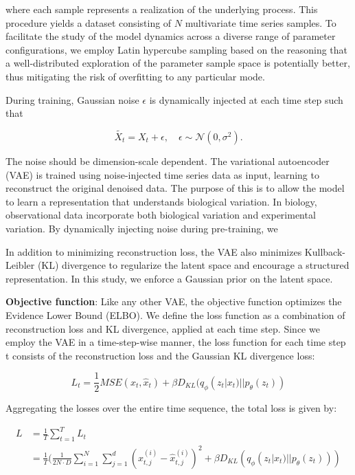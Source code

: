 \documentclass[12pt]{article} %
\begin{document}
where each sample represents a realization of the underlying process. This procedure yields a dataset consisting of \( N \) multivariate time series samples. To facilitate the study of the model dynamics across a diverse range of parameter configurations, we employ Latin hypercube sampling based on the reasoning that a well-distributed exploration of the parameter sample space is potentially better, thus mitigating the risk of overfitting to any particular mode\citep{mckay2000comparison}. 

During training, Gaussian noise \( \epsilon \) is dynamically injected at each time step such that  

$$
\tilde{X_t} = X_t + \epsilon, \quad \epsilon \sim \mathcal{N}(0, \sigma^2).
$$  

The noise should be dimension-scale dependent. The variational autoencoder (VAE) is trained using noise-injected time series data as input, learning to reconstruct the original denoised data. The purpose of this is to allow the model to learn a representation that understands biological variation. In biology, observational data incorporate both biological variation and experimental variation. By dynamically injecting noise during pre-training, we

In addition to minimizing reconstruction loss, the VAE also minimizes Kullback-Leibler (KL) divergence to regularize the latent space and encourage a structured representation. In this study, we enforce a Gaussian prior on the latent space.

\textbf{Objective function}: Like any other VAE, the objective function optimizes the Evidence Lower Bound (ELBO). We define the loss function as a combination of reconstruction loss and KL divergence, applied at each time step. Since we employ the VAE in a time-step-wise manner, the loss function for each time step t consists of the reconstruction loss and the Gaussian KL divergence loss:

$$L_t = \frac{1}{2}MSE(x_t, \hat x_t) + \beta D_{KL}(q_{\phi}(z_{t}|x_{t})||p_{\theta}(z_{t}))$$

Aggregating the losses over the entire time sequence, the total loss is given by:

\begin{align*}
L &= \frac{1}{T}\sum_{t=1}^{T} L_t\\
&= \frac{1}{T}(\frac{1}{2N \cdot D}\sum_{i=1}^{N}\sum_{j=1}^d(x_{t,j}^{(i)} - \hat x_{t,j}^{(i)})^2 + \beta D_{KL}(q_{\phi}(z_{t}|x_{t})||p_{\theta}(z_{t})))
\end{align*}
\end{document}
